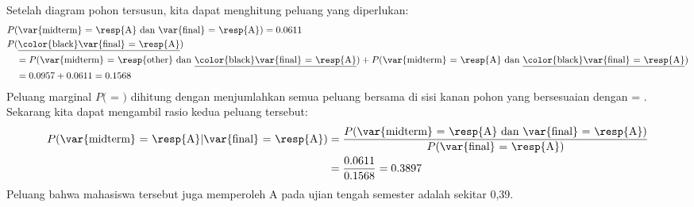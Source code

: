 \begin{examplewrap}
\begin{nexample}
Setelah diagram pohon tersusun, kita dapat menghitung peluang yang diperlukan:
\begin{align*}
&P(\text{\var{midterm} = \resp{A} dan \var{final} = \resp{A}}) = 0.0611 \\
&P(\text{\underline{\color{black}\var{final} = \resp{A}}})  \\
& \quad= P(\text{\var{midterm} = \resp{other} dan \underline{\color{black}\var{final} = \resp{A}}}) + P(\text{\var{midterm} = \resp{A} dan \underline{\color{black}\var{final} = \resp{A}}}) \\
& \quad= 0.0957 + 0.0611  = 0.1568
\end{align*}
Peluang marginal $P($ = $)$ dihitung dengan menjumlahkan semua peluang bersama di sisi kanan pohon yang bersesuaian dengan  = . Sekarang kita dapat mengambil rasio kedua peluang tersebut:
\begin{align*}
P(\text{\var{midterm} = \resp{A}} | \text{\var{final} = \resp{A}})
  &= \frac{P(\text{\var{midterm} = \resp{A}
      dan \var{final} = \resp{A}})}
    {P(\text{\var{final} = \resp{A}})} \\
  &= \frac{0.0611}{0.1568} = 0.3897
\end{align*}
Peluang bahwa mahasiswa tersebut juga memperoleh A pada ujian tengah semester adalah sekitar 0,39.
\end{nexample}
\end{examplewrap}


